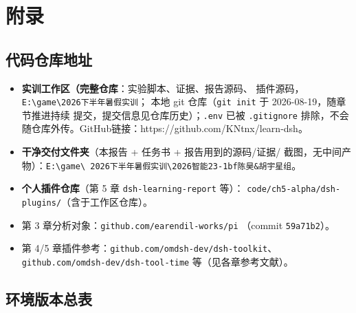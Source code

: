 \clearpage
\appendix
\section{附录}

\subsection{代码仓库地址}

\begin{itemize}[leftmargin=4em,itemsep=0pt,topsep=2pt]
    \item \textbf{实训工作区（完整仓库}：实验脚本、证据、报告源码、
          插件源码，\texttt{E:\textbackslash game\textbackslash 2026下半年暑假实训}；
          本地 git 仓库（\texttt{git init} 于 2026-08-19，随章节推进持续
          提交，提交信息见仓库历史）；\texttt{.env} 已被 \texttt{.gitignore}
          排除，不会随仓库外传。GitHub链接：https://github.com/KNtnx/learn-dsh。
    \item \textbf{干净交付文件夹}（本报告 + 任务书 + 报告用到的源码/证据/
          截图，无中间产物）：\texttt{E:\textbackslash game\textbackslash
          2026下半年暑假实训\textbackslash 2026智能23-1bf陈昊\&胡宇星组}。
    \item \textbf{个人插件仓库}（第 5 章 \texttt{dsh-learning-report} 等）：
          \nolinkurl{code/ch5-alpha/dsh-plugins/}（含于工作区仓库）。
    \item 第 3 章分析对象：\nolinkurl{github.com/earendil-works/pi}
          （commit \texttt{59a71b2}）。
    \item 第 4/5 章插件参考：\nolinkurl{github.com/omdsh-dev/dsh-toolkit}、
          \nolinkurl{github.com/omdsh-dev/dsh-tool-time} 等（见各章参考文献）。
\end{itemize}

\subsection{环境版本总表}

